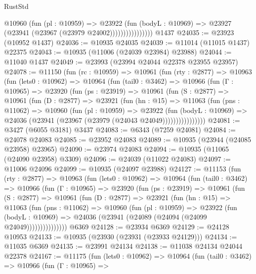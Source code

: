 \begin{lexlean}{RustStd}
\begin{coremodule}
{{{{{{{{{{{{{{{{{{{                        @10960
                          (fun (pl : @10959) =>
                          @23922
                            (fun (bodyL : @10969) =>
                            @23927 (@23941 (@23967 (@23979 @24002))))))))))))))))
    @1437
@24035 := @23923 (@10952 @1437)
@24036 := @10935 @24035
@24039 := @11014 (@11015 @1437) @22375
@24043 := @10935 (@11006 (@24039 @23984) @23988)
@24044 := @11040 @1437
@24049 := @23993 (@23994 @24044 @22378 @23955 @23957)
@24078 := @11150
    (fun (rc : @10959) =>
    @10961
      (fun (rty : @2877) =>
      @10963
        (fun (lets0 : @10962) =>
        @10964
          (fun (tail0 : @3462) =>
          @10966
            (fun (Γ : @10965) =>
            @23920
              (fun (ps : @23919) =>
              @10961
                (fun (S : @2877) =>
                @10961
                  (fun (D : @2877) =>
                  @23921
                    (fun (hn : @15) =>
                    @11063
                      (fun (pns : @11062) =>
                      @10960
                        (fun (pl : @10959) =>
                        @23922
                          (fun (bodyL : @10969) =>
                          @24036 (@23941 (@23967 (@23979 (@24043 @24049))))))))))))))))
@24081 := @3427 (@6055 @3181) @3437
@24083 := @6343 (@7259 @24081)
@24084 := @24078 @24083
@24085 := @23952 @24083
@24089 := @10935 (@23944 (@24085 @23958) @23965)
@24090 := @23974 @24083
@24094 := @10935 (@11065 (@24090 @23958) @3309)
@24096 := @24039 (@11022 @24083)
@24097 := @11006 @24096
@24099 := @10935 (@24097 @23988)
@24127 := @11153
    (fun (rty : @2877) =>
    @10963
      (fun (lets0 : @10962) =>
      @10964
        (fun (tail0 : @3462) =>
        @10966
          (fun (Γ : @10965) =>
          @23920
            (fun (ps : @23919) =>
            @10961
              (fun (S : @2877) =>
              @10961
                (fun (D : @2877) =>
                @23921
                  (fun (hn : @15) =>
                  @11063
                    (fun (pns : @11062) =>
                    @10960
                      (fun (pl : @10959) =>
                      @23922
                        (fun (bodyL : @10969) =>
                        @24036 (@23941 (@24089 (@24094 (@24099 @24049)))))))))))))))
    @6369
@24128 := @23934 @6369
@24129 := @24128 @10953
@24133 := @10935 (@23930 (@23931 (@23933 @24129)))
@24134 := @11035 @6369
@24135 := @23991 @24134
@24138 := @11038 @24134 @24044 @22378
@24167 := @11175
    (fun (lets0 : @10962) =>
    @10964
      (fun (tail0 : @3462) =>
      @10966
        (fun (Γ : @10965) =>
}}}}}}}}}}}}}}}}}}}
\end{coremodule}
\end{lexlean}
